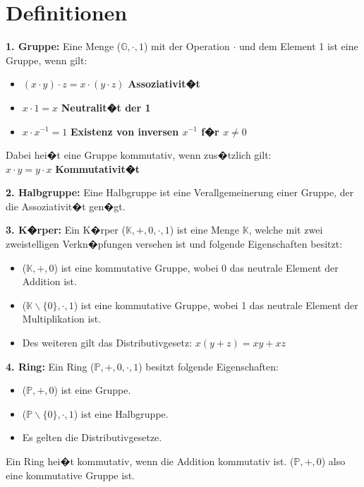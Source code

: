 
\section*{Definitionen}
\textbf{1. Gruppe:} Eine Menge ($\mathbb{G},\cdot, 1$) mit der Operation $\cdot$ und dem Element 1 ist eine Gruppe, wenn gilt:
\begin{itemize}
  \setlength{\itemsep}{-0.4cm}
  \item $(x \cdot y) \cdot z = x \cdot (y \cdot z)$ \textbf{Assoziativit�t}\\
  \item $x \cdot 1 = x$ \textbf{Neutralit�t der 1}\\
  \item $x \cdot x^{-1} = 1$ \textbf{Existenz von inversen $x^{-1}$ f�r $x \neq 0$}
\end{itemize}
Dabei hei�t eine Gruppe kommutativ, wenn zus�tzlich gilt:\\
$x \cdot y = y \cdot x$ \textbf{Kommutativit�t}

\textbf{2. Halbgruppe:} Eine Halbgruppe ist eine Verallgemeinerung einer Gruppe, der die Assoziativit�t gen�gt.

\textbf{3. K�rper:} Ein K�rper ($\mathbb{K}, +, 0, \cdot, 1$) ist eine Menge $\mathbb{K}$, welche mit zwei zweistelligen Verkn�pfungen versehen ist und folgende Eigenschaften besitzt:
\begin{itemize}
  \item ($\mathbb{K}, +, 0$) ist eine kommutative Gruppe, wobei 0 das neutrale Element der Addition ist.
  \item ($\mathbb{K}\backslash \{0\}, \cdot, 1$) ist eine kommutative Gruppe, wobei 1 das neutrale Element der Multiplikation ist.
  \item Des weiteren gilt das Distributivgesetz:
  $x(y + z) = xy + xz$
\end{itemize}

\textbf{4. Ring:} Ein Ring ($\mathbb{P}, +, 0, \cdot, 1$) besitzt folgende Eigenschaften:
\begin{itemize}
  \item ($\mathbb{P}, +, 0$) ist eine Gruppe.
  \item ($\mathbb{P}\backslash\{0\}, \cdot, 1$) ist eine Halbgruppe.
  \item Es gelten die Distributivgesetze.
\end{itemize}
Ein Ring hei�t kommutativ, wenn die Addition kommutativ ist. ($\mathbb{P}, +, 0$) also eine kommutative Gruppe ist.

